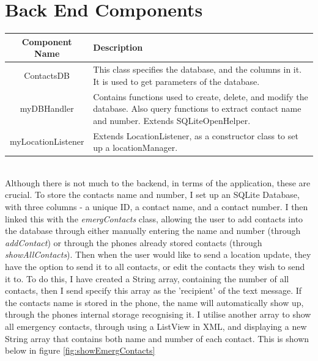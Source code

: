 \documentclass[a4paper]{report}
\begin{document}
	\section{Back End Components} 
	\begin{tabular} 	{|c|p{125mm}|}
		\hline
		Component Name & Description \\
		\hline 
		ContactsDB & This class specifies the database, and the columns in it. It is used to get parameters of the database. \\
		\hline
		myDBHandler & Contains functions used to create, delete, and modify the database. Also query functions to extract contact name and number. Extends SQLiteOpenHelper. \\
		\hline
		myLocationListener & Extends LocationListener, as a constructor class to set up a locationManager. \\
		\hline
	\end{tabular}
	\\
	Although there is not much to the backend, in terms of the application, these are crucial. To store the contacts name and number, I set up an SQLite Database, with three columns - a unique ID, a contact name, and a contact number. I then linked this with the \textit{emergContacts} class, allowing the user to add contacts into the database through either manually entering the name and number (through \textit{addContact}) or through the phones already stored contacts (through \textit{showAllContacts}). Then when the user would like to send a location update, they have the option to send it to all contacts, or edit the contacts they wish to send it to. To do this, I have created a String array, containing the number of all contacts, then I send specify this array as the 'recipient' of the text message. If the contacts name is stored in the phone, the name will automatically show up, through the phones internal storage recognising it. I utilise another array to show all emergency contacts, through using a ListView in XML, and displaying a new String array that contains both name and number of each contact. This is shown below in figure \ref{fig:showEmergContacts}\\
\end{document}
